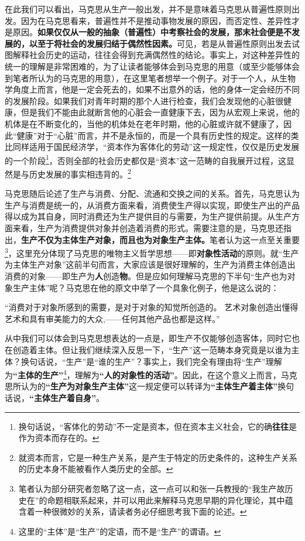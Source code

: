 \documentclass[a4paper,twoside,12pt,AutoFakeBold]{ctexart}
\begin{document}
在此我们可以看出，马克思从生产一般出发，并不是意味着马克思从普遍性原则出发。因为在马克思看来，普遍性并不是推动事物发展的原因，而否定性、差异性才是原因。\textbf{如果仅仅从一般的抽象（普遍性）中考察社会的发展，那末社会便是不发展的，以至于将社会的发展归结于偶然性因素。}可见，若是从普遍性原则出发去试图解释社会历史的运动，往往会得到充满偶然性的结论。事实上，对这种差异性的统一的理解是非常困难的，为了让读者能够体会到马克思的用意（或至少能够体会到笔者所认为的马克思的用意），在这里笔者想举一个例子。对于一个人，从生物学角度上而言，他是一定会死去的，如果不出意外的话，他的身体一定会经历不同的发展阶段。如果我们对青年时期的那个人进行检查，我们会发现他的心脏很健康，但是我们不能由此就断言他的心脏会一直健康下去，因为从宏观上来说，他的机体是在不断变化的，当他的机体处在老年时期，他的心脏或许就不健康了，因此“健康”对于“心脏”而言，并不是永恒的，而是一个具有历史性的规定。这样的类比同样适用于国民经济学，“资本作为客体化的劳动”这一规定性，仅仅是历史发展的一个阶段\footnote{换句话说，“客体化的劳动”不一定是资本，但在资本主义社会，它的确\textbf{往往}是作为资本而存在的。}，否则全部的社会历史都仅是“资本”这一范畴的自我展开过程，这显然是与历史发展的事实相违背的。\footnote{就资本而言，它是一种生产关系，是产生于特定的历史条件的，这种生产关系的历史本身不能被看作人类历史的全部。}

马克思随后论述了生产与消费、分配、流通和交换之间的关系。首先，马克思认为生产与消费是统一的，从消费方面来看，消费使生产得以实现，即使生产出的产品得以成为其自身，同时消费还为生产提供目的与需要，为生产提供前提。从生产方面来看，生产为消费提供对象并创造着消费的形式。需要注意的是，马克思还指出，\textbf{生产不仅为主体生产对象，而且也为对象生产主体。}笔者认为这一点至关重要\footnote{笔者认为部分研究者忽略了这一点，这一点可以和张一兵教授的“我生产故历史在”的命题相联系起来，并可以用此来解释马克思早期的异化理论，其中蕴含着一种很微妙的关系，请读者务必仔细思考我下面的论述。}，这里充分体现了马克思的唯物主义哲学思想——即\textbf{对象性活动}的原则。就“生产为主体生产对象”这前半句而言，大家应该是很好理解的，生产为消费主体创造出消费的对象——即生产为\textbf{人}创造\textbf{物}。但是应如何理解马克思的下半句“生产也为对象生产主体”呢？马克思在他的原文中举了一个具象化例子，他是这么说的：

\begin{fangsong}
“消费对于对象所感到的需要，是对于对象的知觉所创造的。 艺术对象创造出懂得艺术和具有审美能力的大众,——任何其他产品也都是这样。”
\end{fangsong}

从中我们可以体会到马克思想表达的一点是，即生产不仅能够创造客体，同时它也在创造着主体。但让我们继续深入反思一下，“生产”这一范畴本身究竟是以谁为主体？换句话说，“生产”是“谁的生产”？事实上，我们完全有理由将“生产”理解为\textbf{“主体的生产”}\footnote{这里的“主体”是“生产”的定语，而不是“生产”的谓语。}，理解为\textbf{“人的对象性的活动”}。因此，在这个意义上而言，马克思所认为的\textbf{“生产为对象生产主体”}这一规定便可以转译为\textbf{“主体生产着主体”}换句话说，\textbf{“主体生产着自身”}。
\end{document}
